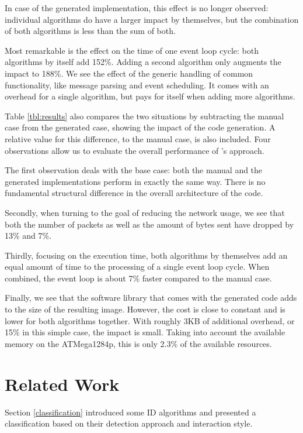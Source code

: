 \documentclass[conference]{IEEEtran}
\begin{document}
In case of the generated implementation, this effect is no longer observed:
individual algorithms do have a larger impact by themselves, but the
combination of both algorithms is less than the sum of both.

Most remarkable is the effect on the time of one event loop cycle: both
algorithms by itself add 152\%. Adding a second algorithm only augments the
impact to 188\%. We see the effect of the generic handling of common
functionality, like message parsing and event scheduling. It comes with an
overhead for a single algorithm, but pays for itself when adding more
algorithms.

Table \ref{tbl:results} also compares the two situations by subtracting the
manual case from the generated case, showing the impact of the code generation.
A relative value for this difference, to the manual case, is also included.
Four observations allow us to evaluate the overall performance of \NAME's
approach.

The first observation deals with the base case: both the manual and the
generated implementations perform in exactly the same way. There is no
fundamental structural difference in the overall architecture of the code.

Secondly, when turning to the goal of reducing the network usage, we see that
both the number of packets as well as the amount of bytes sent have dropped by
13\% and 7\%.

Thirdly, focusing on the execution time, both algorithms by themselves add an
equal amount of time to the processing of a single event loop cycle. When
combined, the event loop is about 7\% faster compared to the manual case.

Finally, we see that the software library that comes with the generated code
adds to the size of the resulting image. However, the cost is close to constant
and is lower for both algorithms together. With roughly 3KB of additional
overhead, or 15\% in this simple case, the impact is small. Taking into account
the available memory on the ATMega1284p, this is only 2.3\% of the available
resources.

\section{Related Work}
\label{related}

Section \ref{classification} introduced some ID algorithms
\cite{ganeriwal2008reputation,mishra2004intrusion,krontiris2009cooperative} and
presented a classification
\cite{mishra2004intrusion,ioannis2007towards,alrajeh2013intrusion} based on
their detection approach and interaction style.
\end{document}
